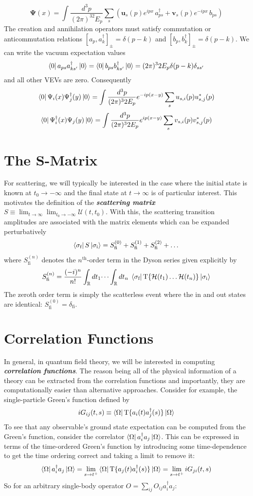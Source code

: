 \documentclass[onecolumn]{gwclass}
\def \*#1{\boldsymbol{#1}}
\renewcommand{\t}[1]{\text{#1}}
\def \timeorder{\t{T}}
\begin{document}
$$ \*\Psi(x) = \int\frac{d^3p}{(2\pi)^32E_p} \sum_s\left( \*u_s(p)e^{ipx} \, a_{ps}^\dagger + \*v_s(p)e^{-ipx}\,b_{ps} \right) $$
The creation and annihilation operators must satisfy commutation or anticommutation relations $[a_p, a_k^\dagger]_\pm=\delta(p-k)$ and $[b_p, b_k^\dagger]_\pm=\delta(p-k)$. We can write the vacuum expectation values 
$$ \bra{0} a_{ps} a_{ks'}^\dagger \ket{0} = \bra{0}b_{ps}b_{ks'}^\dagger\ket{0} = (2\pi)^3 2E_p\delta(p-k)\delta_{ss'} $$
and all other VEVs are zero. Consequently
$$ \bra{0} \Psi_i(x)\Psi_j^\dagger(y) \ket{0} = \int \frac{d^3p}{(2\pi)^32E_p}e^{-ip(x-y)}\sum_s u_{s,i}(p)u^*_{s,j}(p) $$
$$ \bra{0} \Psi_i^\dagger(x)\Psi_j(y) \ket{0} = \int \frac{d^3p}{(2\pi)^32E_p}e^{ip(x-y)}\sum_s v_{s,i}(p)v^*_{s,j}(p) $$






\section{The S-Matrix}
For scattering, we will typically be interested in the case where the initial state is known at $t_0\to-\infty$ and the final state at $t\to\infty$ is of particular interest. This motivates the definition of the \textbf{\emph{scattering matrix}} $ \displaystyle S\equiv \lim_{t\to\infty}\lim_{t_0\to-\infty}\mathcal{U}(t,t_0) $. With this, the scattering transition amplitudes are associated with the matrix elements which can be expanded perturbatively
$$\bra{\sigma_\t{f}}S\ket{\sigma_\t{i}} = S_\t{fi}^{(0)} + S^{(1)}_\t{fi} + S^{(2)}_\t{fi} + \dots$$
where $S_\t{fi}^{(n)}$ denotes the $n^\t{th}$-order term in the Dyson series given explicitly by
$$S_\t{fi}^{(n)} = \frac{(-i)^n}{n!}\int_\mathbb{R} dt_1\dots \int_\mathbb{R} dt_n\; \bra{\sigma_\t{f}} \timeorder\{ \mathcal{H}(t_1)\dots\mathcal{H}(t_n)  \}\ket{\sigma_\t{i}}$$
The zeroth order term is simply the scatterless event where the in and out states are identical: $S_\t{fi}^{(0)}=\delta_\t{fi}$. 
\\

\section{Correlation Functions}
In general, in quantum field theory, we will be interested in computing \textbf{\emph{correlation functions}}. The reason being all of the physical information of a theory can be extracted from the correlation functions and importantly, they are computationally easier than alternative approaches. Consider for example, the single-particle Green's function defined by
$$ iG_{ij}(t,s) \equiv \bra{\Omega}\timeorder\{ a_i(t) a_j^\dagger(s) \}\ket{\Omega} $$
To see that any observable's ground state expectation can be computed from the Green's function, consider the correlator $\bra{\Omega}a_i^\dagger a_j\ket{\Omega}$. This can be expressed in terms of the time-ordered Green's function by introducing some time-dependence to get the time ordering correct and taking a limit to remove it:
$$ \bra{\Omega}a_i^\dagger a_j\ket{\Omega} = \lim_{s\to t^+} \bra{\Omega}\timeorder\{ a_j(t)a_i^\dagger(s) \}\ket{\Omega} = \lim_{s\to t^+} iG_{ji}(t,s) $$
So for an arbitrary single-body operator $O=\sum_{ij} O_{ij}a_i^\dagger a_j$:
\end{document}
